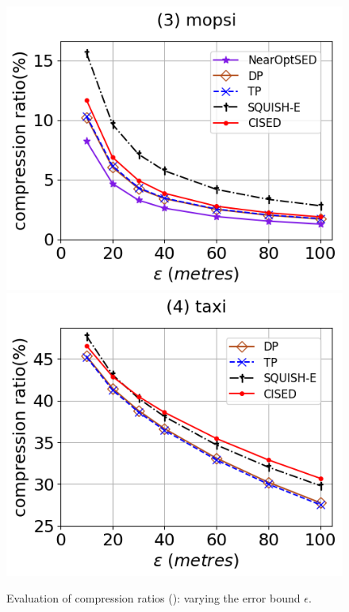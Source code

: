 \begin{figure}[tb!]
	\includegraphics[scale=0.315]{Figures/Exp-SED-CR-epsilon-mopsi.png}		\hspace{1ex}
	\includegraphics[scale=0.315]{Figures/Exp-SED-CR-epsilon-taxi.png}
	\vspace{-2.5ex}
	\caption{\small Evaluation of compression ratios (\sed): varying the error bound $\epsilon$.}
	\label{fig:cr-sed}
	\vspace{-2ex}
\end{figure}


